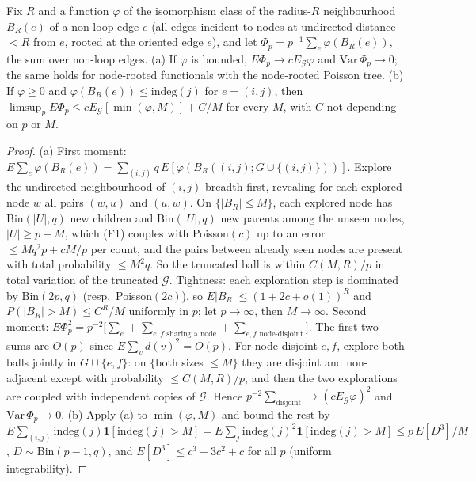 \begin{lemma}\label{lem:er-local}
Fix $R$ and a function $\varphi$ of the isomorphism class of the radius-$R$
neighbourhood $B_R(e)$ of a non-loop edge $e$ (all edges incident to nodes at
undirected distance $<R$ from $e$, rooted at the oriented edge $e$), and let
$\Phi_p=p^{-1}\sum_e\varphi(B_R(e))$, the sum over non-loop edges.
(a) If $\varphi$ is bounded, $E\Phi_p\to cE_{\mathcal G}\varphi$ and
$\mathrm{Var}\,\Phi_p\to0$; the same holds for node-rooted functionals with the
node-rooted Poisson tree.
(b) If $\varphi\ge0$ and $\varphi(B_R(e))\le\mathrm{indeg}(j)$ for $e=(i,j)$, then
$\limsup_pE\Phi_p\le cE_{\mathcal G}[\min(\varphi,M)]+C/M$ for every $M$, with $C$
not depending on $p$ or $M$.
\end{lemma}
\begin{proof}
(a) First moment:
$E\sum_e\varphi(B_R(e))=\sum_{(i,j)}q\,E[\varphi(B_R((i,j);G\cup\{(i,j)\}))]$.
Explore the undirected neighbourhood of $(i,j)$ breadth first, revealing for
each explored node $w$ all pairs $(w,u)$ and $(u,w)$. On $\{|B_R|\le M\}$, each
explored node has $\mathrm{Bin}(|U|,q)$ new children and $\mathrm{Bin}(|U|,q)$
new parents among the unseen nodes, $|U|\ge p-M$, which (F1) couples with
Poisson$(c)$ up to an error $\le Mq^2p+cM/p$ per count, and the pairs between
already seen nodes are present with total probability $\le M^2q$. So the
truncated ball is within $C(M,R)/p$ in total variation of the truncated
$\mathcal G$. Tightness: each exploration step is dominated by
$\mathrm{Bin}(2p,q)$ (resp.\ Poisson$(2c)$), so $E|B_R|\le(1+2c+o(1))^R$ and
$P(|B_R|>M)\le C^R/M$ uniformly in $p$; let $p\to\infty$, then $M\to\infty$.
Second moment: $E\Phi_p^2=p^{-2}\big[\sum_e+\sum_{e,f\text{ sharing a node}}+\sum_{e,f\text{ node-disjoint}}\big]$.
The first two sums are $O(p)$ since $E\sum_vd(v)^2=O(p)$. For node-disjoint
$e,f$, explore both balls jointly in $G\cup\{e,f\}$: on $\{$both sizes $\le M\}$
they are disjoint and non-adjacent except with probability $\le C(M,R)/p$, and
then the two explorations are coupled with independent copies of $\mathcal G$.
Hence $p^{-2}\sum_{\text{disjoint}}\to(cE_{\mathcal G}\varphi)^2$ and
$\mathrm{Var}\,\Phi_p\to0$.
(b) Apply (a) to $\min(\varphi,M)$ and bound the rest by
$E\sum_{(i,j)}\mathrm{indeg}(j)\mathbf 1[\mathrm{indeg}(j)>M]=E\sum_j\mathrm{indeg}(j)^2\mathbf 1[\mathrm{indeg}(j)>M]\le p\,E[D^3]/M$,
$D\sim\mathrm{Bin}(p-1,q)$, and $E[D^3]\le c^3+3c^2+c$ for all $p$ (uniform
integrability).
\end{proof}

